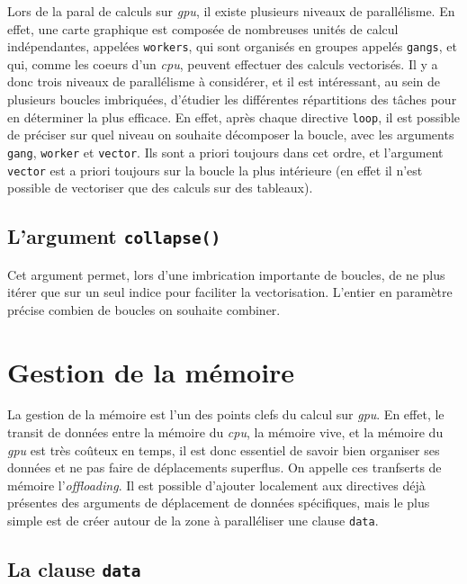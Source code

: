 \documentclass{article}
\begin{document}
Lors de la \gls{paral} de calculs sur \textit{\gls{gpu}}, il existe plusieurs niveaux de parallélisme. En effet, une carte graphique est composée de nombreuses unités de calcul indépendantes, appelées \texttt{workers}, qui sont organisés en groupes appelés \texttt{gangs}, et qui, comme les \gls{coeur}s d'un \textit{\gls{cpu}}, peuvent effectuer des calculs vectorisés. Il y a donc trois niveaux de parallélisme à considérer, et il est intéressant, au sein de plusieurs boucles imbriquées, d'étudier les différentes répartitions des tâches pour en déterminer la plus efficace. En effet, après chaque directive \texttt{loop}, il est possible de préciser sur quel niveau on souhaite décomposer la boucle, avec les arguments \texttt{gang}, \texttt{worker} et \texttt{vector}. Ils sont a priori toujours dans cet ordre, et l'argument \texttt{vector} est a priori toujours sur la boucle la plus intérieure (en effet il n'est possible de vectoriser que des calculs sur des tableaux). 

\subsection{L'argument  \texttt{collapse()}}

Cet argument permet, lors d'une imbrication importante de boucles, de ne plus itérer que sur un seul indice pour faciliter la vectorisation. L'entier en paramètre précise combien de boucles on souhaite combiner.


\section{Gestion de la mémoire}

La gestion de la mémoire est l'un des points clefs du calcul sur \textit{\gls{gpu}}. En effet, le transit de données entre la mémoire du \textit{\gls{cpu}}, la mémoire vive, et la mémoire du \textit{\gls{gpu}} est très coûteux en temps, il est donc essentiel de savoir bien organiser ses données et ne pas faire de déplacements superflus. On appelle ces tranfserts de mémoire l'\textit{offloading}. Il est possible d'ajouter localement aux directives déjà présentes des arguments de déplacement de données spécifiques, mais le plus simple est de créer autour de la zone à paralléliser une clause \texttt{data}.

\subsection{La clause \texttt{data}}
\end{document}
